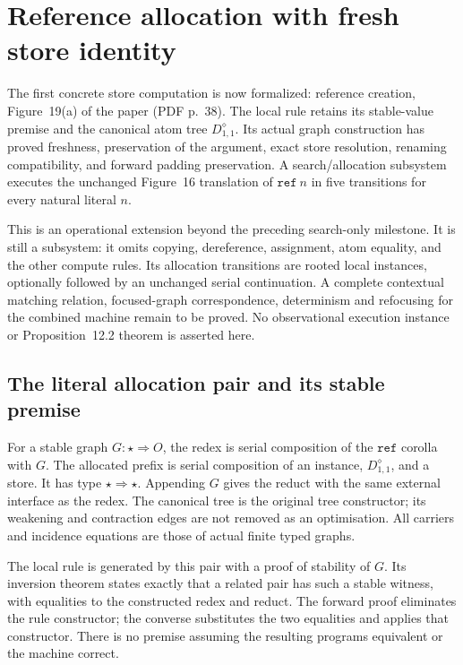\clearpage
\section{Reference allocation with fresh store identity}
\label{sec:copying-allocation}
The first concrete store computation is now formalized: reference creation,
Figure~19(a) of the paper (PDF p.~38). The local rule retains its stable-value
premise and the canonical atom tree $D^{\diamond}_{1,1}$. Its actual graph
construction has proved freshness, preservation of the argument, exact store
resolution, renaming compatibility, and forward padding preservation. A
search/allocation subsystem executes the unchanged Figure~16 translation of
$\mathtt{ref}\ n$ in five transitions for every natural literal $n$.

This is an operational extension beyond the preceding search-only milestone.
It is still a subsystem: it omits copying, dereference, assignment, atom equality,
and the other compute rules. Its allocation transitions are rooted local
instances, optionally followed by an unchanged serial continuation. A complete
contextual matching relation, focused-graph correspondence, determinism and
refocusing for the combined machine remain to be proved. No observational
execution instance or Proposition~12.2 theorem is asserted here.

\subsection{The literal allocation pair and its stable premise}

For a stable graph $G:\star\Rightarrow O$, the redex is serial composition
of the $\mathtt{ref}$ corolla with $G$. The allocated prefix is serial
composition of an instance, $D^{\diamond}_{1,1}$, and a store. It has type
$\star\Rightarrow\star$. Appending $G$ gives the reduct with the same external
interface as the redex. The canonical tree is the original tree constructor;
its weakening and contraction edges are not removed as an optimisation.
All carriers and incidence equations are those of actual finite typed graphs.

The local rule is generated by this pair with a proof of stability of $G$.
Its inversion theorem states exactly that a related pair has such a stable
witness, with equalities to the constructed redex and reduct. The forward
proof eliminates the rule constructor; the converse substitutes the two
equalities and applies that constructor. There is no premise assuming the
resulting programs equivalent or the machine correct.

